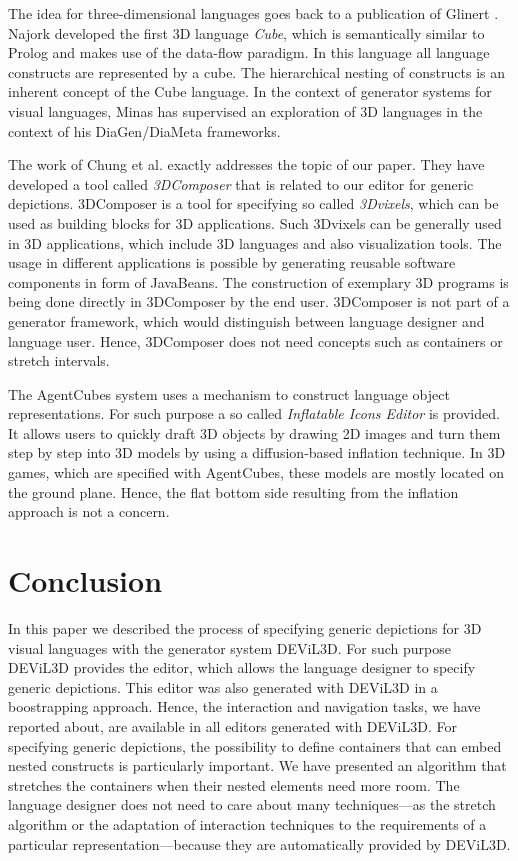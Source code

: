 \documentclass[a4paper]{article}
\newcommand{\dev}{DEViL3D\xspace}
\begin{document}
The idea for three-dimensional languages goes back to a publication of Glinert \cite{Gli87}. Najork \cite{Naj96} developed the first 3D language \emph{Cube}, which is semantically similar to Prolog and makes use of the data-flow paradigm. In this language all language constructs are represented by a cube. The hierarchical nesting of constructs is an inherent concept of the Cube language. In the context of generator systems for visual languages, Minas has supervised an exploration \cite{Vos09} of 3D languages in the context of his DiaGen/DiaMeta \cite{Min02, Min06} frameworks.

The work of Chung et al. \cite{CHM99} exactly addresses the topic of our paper. They have developed a tool called \emph{3DComposer} that is related to our editor for generic depictions. 3DComposer is a tool for specifying so called \emph{3Dvixels}, which can be used as building blocks for 3D applications. Such 3Dvixels can be generally used in 3D applications, which include 3D languages and also visualization tools. The usage in different applications is possible by generating reusable software components in form of JavaBeans. The construction of exemplary 3D programs is being done directly in 3DComposer by the end user. 3DComposer is not part of a generator framework, which would distinguish between language designer and language user. Hence, 3DComposer does not need concepts such as containers or stretch intervals.

The AgentCubes \cite{IRW09} system uses a mechanism to construct language object representations. For such purpose a so called \emph{Inflatable Icons Editor} is provided. It allows users to quickly draft 3D objects by drawing 2D images and turn them step by step into 3D models by using a diffusion-based inflation technique. In 3D games, which are specified with AgentCubes, these models are mostly located on the ground plane. Hence, the flat bottom side resulting from the inflation approach is not a concern.



\section{Conclusion}
\label{sec:conclusion}
In this paper we described the process of specifying generic depictions for 3D visual languages with the generator system \dev. For such purpose \dev provides the editor, which allows the language designer to specify generic depictions. This editor was also generated with \dev in a boostrapping approach. Hence, the interaction and navigation tasks, we have reported about, are available in all editors generated with \dev. For specifying generic depictions, the possibility to define containers that can embed nested constructs is particularly important. We have presented an algorithm that stretches the containers when their nested ele\-ments need more room. The language designer does not need to care about many techniques---as the stretch algorithm or the adaptation of interaction techniques to the requirements of a particular representation---because they are automatically provided by \dev.
\end{document}
